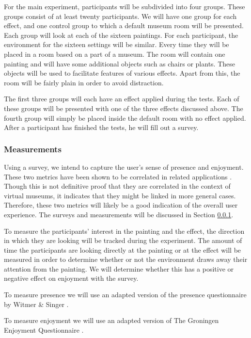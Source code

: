 \documentclass[a4paper]{article}
\begin{document}
For the main experiment, participants will be subdivided into four groups. These groups consist of at least twenty participants. We will have one group for each effect, and one control group to which a default museum room will be presented. Each group will look at each of the sixteen paintings. 
For each participant, the environment for the sixteen settings will be similar. Every time they will be placed in a room based on a part of a museum. The room will contain one painting and will have some additional objects such as chairs or plants. These objects will be used to facilitate features of various effects. Apart from this, the room will be fairly plain in order to avoid distraction.

The first three groups will each have an effect applied during the tests. Each of these groups will be presented with one of the three effects discussed above. The fourth group will simply be placed inside the default room with no effect applied. After a participant has finished the tests, he will fill out a survey. 

\subsubsection{Measurements}\label{sec:measurements}

Using a survey, we intend to capture the user's sense of presence and enjoyment. These two metrics have been shown to be correlated in related applications \cite{sylaiou}. Though this is not definitive proof that they are correlated in the context of virtual museums, it indicates that they might be linked in more general cases. Therefore, these two metrics will likely be a good indication of the overall user experience. The surveys and measurements will be discussed in Section \ref{sec:measurements}.

To measure the participants' interest in the painting and the effect, the direction in which they are looking will be tracked during the experiment. The amount of time the participants are looking directly at the painting or at the effect will be measured in order to determine whether or not the environment draws away their attention from the painting. We will determine whether this has a positive or negative effect on enjoyment with the survey.

To measure presence we will use an adapted version of the presence questionnaire by Witmer \& Singer \cite{witmer}.

To measure enjoyment we will use an adapted version of The Groningen Enjoyment Questionnaire \cite{stevens}.
\end{document}

